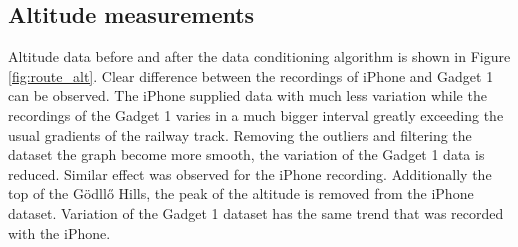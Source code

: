 \documentclass{article}
\begin{document}
		\subsection{Altitude measurements}
			Altitude data before and after the data conditioning algorithm is shown in Figure \ref{fig:route_alt}. Clear difference between the recordings of iPhone and Gadget 1 can be observed. The iPhone supplied data with much less variation while the recordings of the Gadget 1 varies in a much bigger interval greatly exceeding the usual gradients of the railway track. Removing the outliers and filtering the dataset the graph become more smooth, the variation of the Gadget 1 data is reduced. Similar effect was observed for the iPhone recording. Additionally the top of the Gödllő Hills, the peak of the altitude is removed from the iPhone dataset. Variation of the Gadget 1 dataset has the same trend that was recorded with the iPhone.
\end{document}
